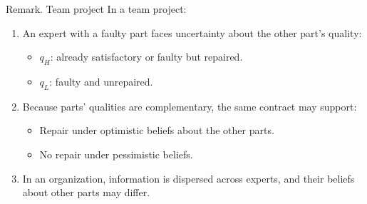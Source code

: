 \documentclass[10pt,aspectratio=169, compressed]{beamer}
\begin{document}

\begin{frame}{Remark. Team project}
In a team project: 
\smallskip

\begin{enumerate}
\item An expert with a faulty part faces uncertainty about the other part's quality:
\begin{itemize}
    \item $q_H$: already satisfactory or faulty but repaired.
    \item $q_L$: 	faulty and unrepaired.
\end{itemize}

\medskip

\item Because parts' qualities are complementary, the same contract may support:
\begin{itemize}
    \item Repair under optimistic beliefs about the other parts.
    \item No repair under pessimistic beliefs.
\end{itemize}

\medskip

\item In an organization, information is dispersed across experts, and their beliefs about other parts may differ.
\end{enumerate}
\end{frame}
\end{document}
